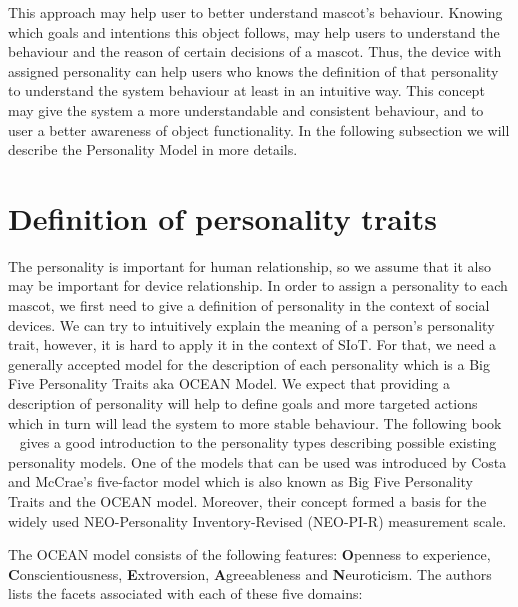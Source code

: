 This approach may help user to better understand mascot's behaviour.
Knowing which goals and intentions this object follows, may help users to understand the
behaviour and the reason of certain decisions of a mascot.
Thus, the device with assigned personality can help users who knows the definition
of that personality to understand the system behaviour at least in an intuitive way.
This concept may give the system a more understandable and consistent behaviour,
and to user a better awareness of object functionality.
In the following subsection we will describe the Personality Model in more details.

\section{Definition of personality traits}
\label{sec:Definition of Personality Traits}

The personality is important for human relationship, so we assume that it also may be important for device relationship.
In order to assign a personality to each mascot, we first need to give a definition of
personality in the context of social devices.
We can try to intuitively explain the meaning of a person’s personality trait,
however, it is hard to apply it in the context of SIoT\@.
For that, we need a generally accepted model for the description of each personality which is a
Big Five Personality Traits aka OCEAN Model\@.
We expect that providing a description of personality will help to define goals and
more targeted actions which in turn will lead the system to more stable behaviour.
The following book ~\cite{matthews2003personality} gives a good introduction to the
personality types describing possible existing personality models.
One of the models that can be used was introduced by Costa and McCrae’s five-factor
model which is also known as Big Five Personality Traits and the OCEAN model.
Moreover, their concept formed a basis for the widely used NEO-Personality
Inventory-Revised (NEO-PI-R) measurement scale.

The OCEAN model consists of the following features: \textbf{O}penness to experience,
\textbf{C}onscientiousness, \textbf{E}xtroversion, \textbf{A}greeableness and \textbf{N}euroticism.
The authors lists the facets associated with each of these five domains:

